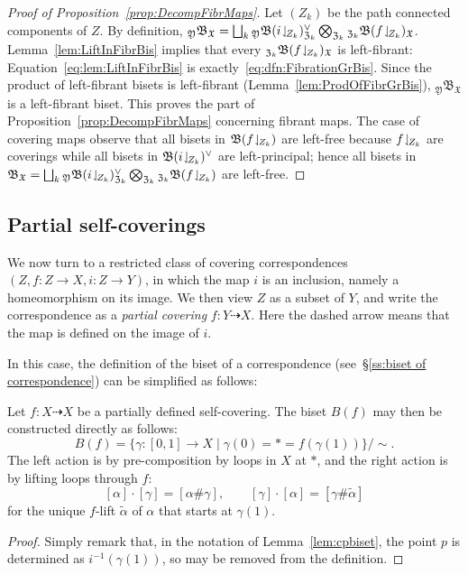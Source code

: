 \documentclass{amsart}
\begin{document}
\begin{proof}[Proof of Proposition~\ref{prop:DecompFibrMaps}]
  Let $(Z_k)$ be the path connected components of $Z$. By definition,
  ${}_{\mathfrak Y}\mathfrak B_{\mathfrak X} = \bigsqcup_{k} {}_{\mathfrak
    Y}\mathfrak B(i\!\downharpoonleft_{\!Z_k})^\vee_{\mathfrak Z_k} \bigotimes_{\mathfrak
    Z_k} {}_{\mathfrak Z_k}\mathfrak B(f\!\downharpoonleft_{\!Z_k})_{\mathfrak
    X}$. Lemma~\ref{lem:LiftInFibrBis} implies that every ${}_{\mathfrak
    Z_k}\mathfrak B(f\!\downharpoonleft_{\!Z_k})_{\mathfrak X}$ is left-fibrant:
  Equation~\eqref{eq:lem:LiftInFibrBis} is
  exactly~\eqref{eq:dfn:FibrationGrBis}.  Since the product of left-fibrant
  bisets is left-fibrant (Lemma~\ref{lem:ProdOfFibrGrBis}), ${}_{\mathfrak Y}\mathfrak B_{\mathfrak X}$ is a
  left-fibrant biset. This proves the part of
  Proposition~\ref{prop:DecompFibrMaps} concerning fibrant maps. The case
  of covering maps observe that all bisets in $\mathfrak B(f\!\downharpoonleft_{\!Z_k})$ are left-free because $f\!\downharpoonleft_{\!Z_k}$ are coverings while all bisets in $\mathfrak B(i\!\downharpoonleft_{\!Z_k})^\vee$ are left-principal; hence all 
  bisets in $\mathfrak B_{\mathfrak X} = \bigsqcup_{k} {}_{\mathfrak
    Y}\mathfrak B(i\!\downharpoonleft_{\!Z_k})^\vee_{\mathfrak Z_k} \bigotimes_{\mathfrak
    Z_k} {}_{\mathfrak Z_k}\mathfrak B(f\!\downharpoonleft_{\!Z_k})$ are left-free. 
\end{proof}

\subsection{Partial self-coverings}
\label{ss:PartSelfCov}
We now turn to a restricted class of covering correspondences $(Z,f\colon
Z\to X, i\colon Z\to Y)$, in which the map $i$ is an inclusion, namely a
homeomorphism on its image. We then view $Z$ as a subset of $Y$, and write
the correspondence as a \emph{partial covering} $f\colon Y\dashrightarrow
X$. Here the dashed arrow means that the map is defined on the image of
$i$.

In this case, the definition of the biset of a correspondence
(see~\S\ref{ss:biset of correspondence}) can be simplified as follows:
\begin{lem}
  Let $f\colon X\dashrightarrow X$ be a partially defined self-covering. The
  biset $B(f)$ may then be constructed directly as follows:
  \[B(f)=\{\gamma\colon[0,1]\to X\mid\gamma(0)=*=f(\gamma(1))\}/{\sim}.
  \]
  The left action is by pre-composition by loops in $X$ at $*$, and
  the right action is by lifting loops through $f$:
  \[[\alpha]\cdot[\gamma]=[\alpha\#\gamma],\qquad[\gamma]\cdot[\alpha]=[\gamma\#\tilde\alpha]
  \]
  for the unique $f$-lift $\tilde\alpha$ of $\alpha$ that starts at
  $\gamma(1)$.
\end{lem}
\begin{proof}
  Simply remark that, in the notation of Lemma~\ref{lem:cpbiset}, the
  point $p$ is determined as $i^{-1}(\gamma(1))$, so may be removed
  from the definition.
\end{proof}
\end{document}
